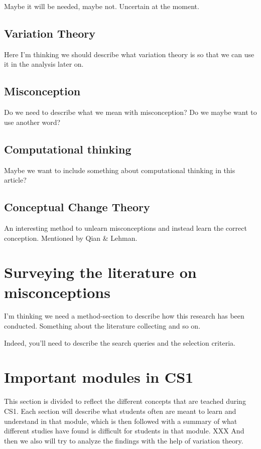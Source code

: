 \documentclass[twocolumn]{article}
\begin{document}
Maybe it will be needed, maybe not. Uncertain at the moment.

\subsection{Variation Theory}

Here I'm thinking we should describe what variation theory is so that we can use it in the analysis later on.

\subsection{Misconception}

Do we need to describe what we mean with misconception? Do we maybe want to use another word? 

\subsection{Computational thinking}

Maybe we want to include something about computational thinking in this article? 

\subsection{Conceptual Change Theory}

An interesting method to unlearn misconceptions and instead learn the correct conception. Mentioned by Qian \& Lehman. 


\section{Surveying the literature on misconceptions}

I'm thinking we need a method-section to describe how this research has been 
conducted. Something about the literature collecting and so on. 

Indeed, you'll need to describe the search queries and the selection criteria.


\section{Important modules in CS1}

This section is divided to reflect the different concepts that are teached during CS1. Each section will describe what students often are meant to learn and understand in that module, which is then followed with a summary of what different studies have found is difficult for students in that module. XXX And then we also will try to analyze the findings with the help of variation theory. 
\end{document}
